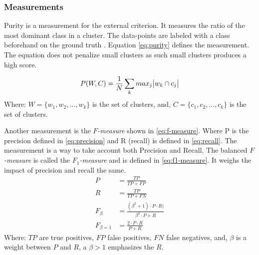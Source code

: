 \documentclass[../report.tex]{subfiles}
\begin{document}
\subsubsection{Measurements}
Purity is a measurement for the external criterion. It measures the ratio of the most dominant class in a cluster. The data-points are labeled with a class beforehand on the ground truth \cite{manning2010introduction}. Equation \ref{eq:purity} defines the measurement. The equation does not penalize small clusters as such small clusters produces a high score.

\begin{equation}
  \label{eq:purity}
  P(W, C) = \frac{1}{N}\sum_{k}max_{j}\abs{w_k \cap c_j}
\end{equation}
Where:\newline
$W = \{w_1,w_2,...,w_k\}$ is the set of clusters, and,
$C = \{c_1,c_2,...,c_k\}$ is the set of clusters.

Another measurement is the \textit{$F$-measure} shown in \ref{eq:f-measure}\cite{manning2010introduction}. Where P is the precision defined in \ref{eq:precision} and R (recall) is defined in \ref{eq:recall}. The measurement is a way to take account both Precision and Recall. The balanced \textit{$F$-measure} is called the \textit{$F_1$-measure} and is defined in \ref{eq:f1-measure}. It weighs the impact of precision and recall the same.
\begin{align}
  \label{eq:precision}
  P &= \frac{TP}{TP+FP} \\
  \label{eq:recall}
  R &= \frac{TP}{TP+FN} \\
  \label{eq:f-measure}
  F_\beta &= \frac{(\beta^2 + 1) \cdot P \cdot R)}{\beta^2 \cdot P + R} \\
  \label{eq:f1-measure}
  F_{\beta = 1} &= \frac{2 \cdot P \cdot R}{P + R}
\end{align}
Where:\newline
$TP$ are true positives, $FP$ false positives, $FN$ false negatives, and, $\beta$ is a weight between $P$ and $R$, a $\beta > 1$ emphasizes the $R$.
\end{document}
